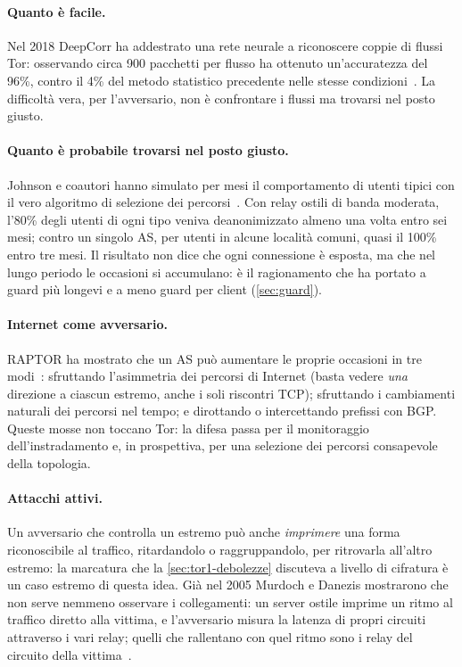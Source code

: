 \paragraph{Quanto è facile.} Nel 2018 DeepCorr ha addestrato una rete neurale a riconoscere coppie di flussi Tor: osservando circa 900 pacchetti per flusso ha ottenuto un'accuratezza del 96\%, contro il 4\% del metodo statistico precedente nelle stesse condizioni~\cite{nasr2018deepcorr}. La difficoltà vera, per l'avversario, non è confrontare i flussi ma trovarsi nel posto giusto.

\paragraph{Quanto è probabile trovarsi nel posto giusto.} Johnson e coautori hanno simulato per mesi il comportamento di utenti tipici con il vero algoritmo di selezione dei percorsi~\cite{johnson2013users}. Con relay ostili di banda moderata, l'80\% degli utenti di ogni tipo veniva deanonimizzato almeno una volta entro sei mesi; contro un singolo AS, per utenti in alcune località comuni, quasi il 100\% entro tre mesi. Il risultato non dice che ogni connessione è esposta, ma che nel lungo periodo le occasioni si accumulano: è il ragionamento che ha portato a guard più longevi e a meno guard per client (\cref{sec:guard}).

\paragraph{Internet come avversario.} RAPTOR ha mostrato che un AS può aumentare le proprie occasioni in tre modi~\cite{sun2015raptor}: sfruttando l'asimmetria dei percorsi di Internet (basta vedere \emph{una} direzione a ciascun estremo, anche i soli riscontri TCP); sfruttando i cambiamenti naturali dei percorsi nel tempo; e dirottando o intercettando prefissi con BGP. Queste mosse non toccano Tor: la difesa passa per il monitoraggio dell'instradamento e, in prospettiva, per una selezione dei percorsi consapevole della topologia.

\paragraph{Attacchi attivi.} Un avversario che controlla un estremo può anche \emph{imprimere} una forma riconoscibile al traffico, ritardandolo o raggruppandolo, per ritrovarla all'altro estremo: la marcatura che la \cref{sec:tor1-debolezze} discuteva a livello di cifratura è un caso estremo di questa idea. Già nel 2005 Murdoch e Danezis mostrarono che non serve nemmeno osservare i collegamenti: un server ostile imprime un ritmo al traffico diretto alla vittima, e l'avversario misura la latenza di propri circuiti attraverso i vari relay; quelli che rallentano con quel ritmo sono i relay del circuito della vittima~\cite{murdoch2005lowcost}.

